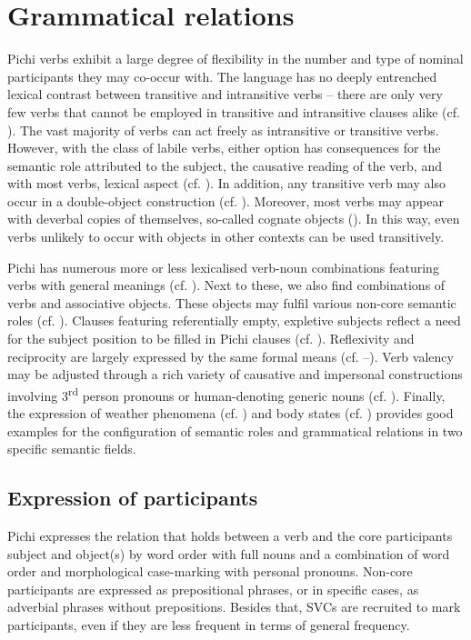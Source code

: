 \chapter{Grammatical relations}

Pichi verbs exhibit a large degree of flexibility in the number and type of nominal participants they may co-occur with. The language has no deeply entrenched lexical contrast between transitive and intransitive verbs – there are only very few verbs that cannot be employed in transitive and intransitive clauses alike (cf. ). The vast majority of verbs can act freely as intransitive or transitive verbs. However, with the class of labile verbs, either option has consequences for the semantic role attributed to the subject, the causative reading of the verb, and with most verbs, lexical aspect (cf. ). In addition, any transitive verb may also occur in a double-object construction (cf. ). Moreover, most verbs may appear with deverbal copies of themselves, so-called cognate objects (). In this way, even verbs unlikely to occur with objects in other contexts can be used transitively. 


Pichi has numerous more or less lexicalised verb-noun combinations featuring verbs with general meanings (cf. ). Next to these, we also find combinations of verbs and associative objects. These objects may fulfil various non-core semantic roles (cf. ). Clauses featuring referentially empty, expletive subjects reflect a need for the subject position to be filled in Pichi clauses (cf. ). Reflexivity and reciprocity are largely expressed by the same formal means (cf. –). Verb valency may be adjusted through a rich variety of causative and impersonal constructions involving 3\textsuperscript{rd} person pronouns or human-denoting generic nouns (cf. ). Finally, the expression of weather phenomena (cf. ) and body states (cf. ) provides good examples for the configuration of semantic roles and grammatical relations in two specific semantic fields.


\section{Expression of participants}\label{sec:9.1}

Pichi expresses the relation that holds between a verb and the core participants subject and object(s) by word order with full nouns and a combination of word order and morphological case-marking with personal pronouns. Non-core participants are expressed as prepositional phrases, or in specific cases, as adverbial phrases without prepositions. Besides that, SVCs are recruited to mark participants, even if they are less frequent in terms of general frequency. 

